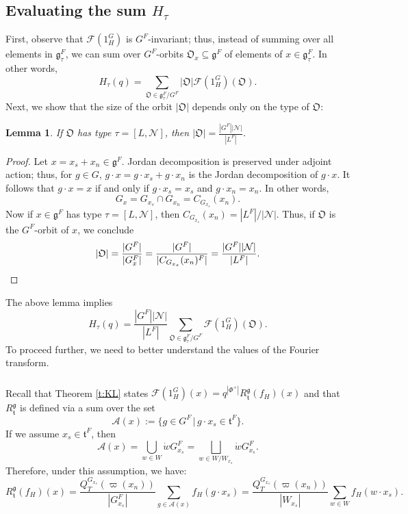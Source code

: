 \documentclass[12pt]{amsart}
\theoremstyle{plain}
\newtheorem{lem}[thm]{Lemma}
\theoremstyle{definition}
\theoremstyle{remark}
\newcommand{\cN}{\mathcal{N}}
\newcommand{\fg}{\mathfrak{g}}
\newcommand{\ft}{\mathfrak{t}}
\begin{document}
\subsection{Evaluating the sum $H_\tau$} 
First, observe that $\mathcal{F}(1_{H}^G)$ is $G^F$-invariant; thus, instead of summing over all elements in $\fg^F_\tau$, we can sum over $G^F$-orbits $\mathfrak{O}_x\subseteq \fg^F$ of elements of $x\in \fg^F_\tau$. In other words,  
\[
H_\tau(q)= \displaystyle \sum_{\mathfrak{O} \in \fg^F_\tau/G^F} |\mathfrak{O}| \mathcal{F}(1_{H}^G)(\mathfrak{O}). 
\]
Next, we show that the size of the orbit $|\mathfrak{O}|$ depends only on the type of $\mathfrak{O}$: 
\begin{lem} If $\mathfrak{O}$ has type $\tau=[L,\cN]$, then 
$\displaystyle |\mathfrak{O}| =\frac{|G^F||\cN|}{|L^F|}$. 
\end{lem} 
\begin{proof} 
Let $x=x_s+x_n\in \fg^F$.  Jordan decomposition is preserved under adjoint action; thus, for $g\in G$, $g\cdot x=g\cdot x_s+g\cdot x_n$ is the Jordan decomposition of $g\cdot x$. It follows that  $g\cdot x=x$ if and only if $g\cdot x_s=x_s$ and $g\cdot x_n=x_n$. In other words,  
\[
G_x=G_{x_s}\cap G_{x_n} = C_{G_{x_s}}(x_n).
\]
 Now if $x\in \fg^F$ has type $\tau=[L,\cN]$, then 
$C_{G_{x_s}}(x_n)=|L^F|/|\cN|$. Thus, if $\mathfrak{O}$ is the $G^F$-orbit of $x$, we conclude 
\[
|\mathfrak{O}| = \frac{|G^F|}{|G_{x}^F|}=\frac{|G^F|}{|C_{G_{x_s}}(x_n)^F|}=\frac{|G^F||\cN|}{|L^F|}. \qedhere
\]
\end{proof} 
The above lemma implies 
\[
H_\tau(q)= \frac{|G^F||\mathcal{N}|}{|L^F|} \displaystyle \sum_{\mathfrak{O} \in \fg^F_\tau/G^F} \mathcal{F}(1_{H}^G)(\mathfrak{O}). 
\]
To proceed further, we need to better understand the values of the Fourier transform. 

\subsubsection{} 
Recall that Theorem \ref{t:KL} states $\mathcal{F}(1_{H}^G)(x)=q^{|\Phi^+|} R_{\ft}^{\fg}(f_H)(x)$ and that $R_{\ft}^\fg$ is defined via a sum over the set 
\[
\mathcal{A}(x):=\{g\in G^F\, |\, g\cdot x_s\in \ft^F\}.
\]
 If we assume $x_s\in \ft^F$, then 
\[
\mathcal{A}(x) = \bigcup_{w\in W} \dot{w}G_{x_s}^F=\bigsqcup_{w\in W/W_{x_s}} \dot{w}G_{x_s}^F. 
\]
Therefore,  under this assumption, we have:
\[
R_{\ft}^{\fg}(f_H)(x) = 
\frac{Q_{T}^{G_{x_s}}(\varpi(x_n))}{|G_{x_s}^F|} \sum_{g\in \mathcal{A}(x)}  f_H(g\cdot x_s)=
\frac{Q_{T}^{G_{x_s}}(\varpi(x_n))}{ |W_{x_s}|} \sum_{w\in W} f_H(w\cdot x_s). 
\]
\end{document}
